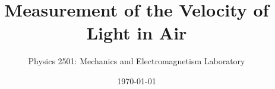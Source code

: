 \documentclass{revtex4}
\begin{document}

\title{Measurement of the Velocity of Light in Air}


\author{Physics 2501: Mechanics and Electromagnetism Laboratory}


\date{\today}



\setlength{\topmargin}{0in}

\maketitle

\end{document}
